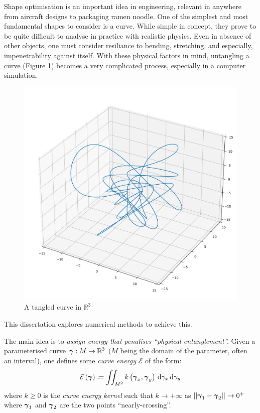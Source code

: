 \documentclass[../dissertation.tex]{subfiles}
\begin{document}
Shape optimisation is an important idea in engineering, relevant in anywhere from aircraft designs to packaging ramen noodle.
One of the simplest and most fundamental shapes to consider is a curve.
While simple in concept, they prove to be quite difficult to analyse in practice with realistic physics.
Even in absence of other objects, one must consider resiliance to bending, stretching, and especially, impenetrability against itself.
With these physical factors in mind, untangling a curve (Figure \ref{fig: Knot}) becomes a very complicated process,
especially in a computer simulation.
\begin{figure}[tpb]
    \centering
    \includegraphics[scale=0.3]{sections/introductionImgs/knot}
    \caption{A tangled curve in $\mathbb{R}^3$}
    \label{fig: Knot}
\end{figure}
This dissertation explores numerical methods to achieve this.

The main idea is to \emph{assign energy that penalises ``physical entanglement''.}
Given a parameterised curve $\boldsymbol{\gamma}:M \rightarrow \mathbb{R}^3$ ($M$ being the domain of the parameter, often an interval),
one defines some \emph{curve energy} $\mathcal{E}$ of the form:
\begin{equation}
    \mathcal{E} \left( \boldsymbol{\gamma} \right) \coloneqq \iint_{M^2} k\left( \boldsymbol{\gamma}_x, \boldsymbol{\gamma}_y \right) \, \text{d} \gamma_x \, \text{d} \gamma_y
\end{equation}
where $k \geq 0$ is the \emph{curve energy kernel} such that $k \rightarrow +\infty$ as $\lvert \lvert \boldsymbol{\gamma}_1 - \boldsymbol{\gamma}_2 \rvert \rvert \rightarrow 0^+$ where $\boldsymbol{\gamma}_1$ and $\boldsymbol{\gamma}_2$ are the two points ``nearly-crossing''.
\end{document}
